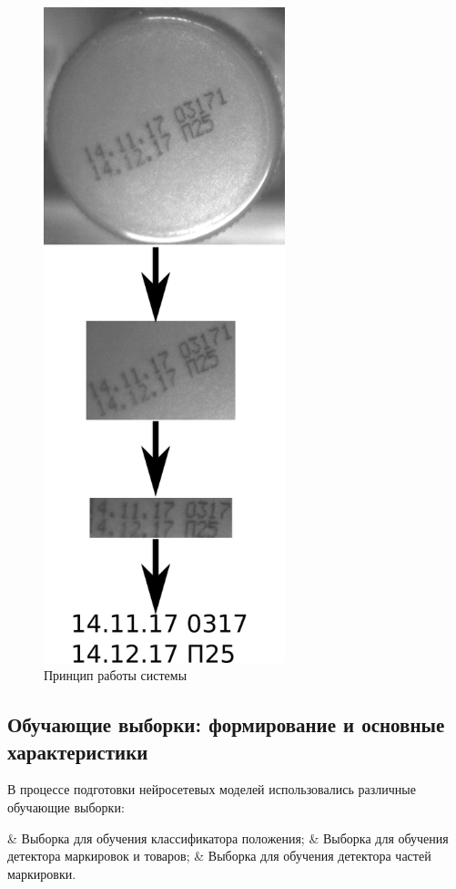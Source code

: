 \begin{figure}[!ht]
	\centering
	\includegraphics[width=7cm]{man-source/images/ch4/pic4-5.png}
	\caption{Принцип работы системы}
	\label{fig:system_work}
\end{figure}

\subsection{Обучающие выборки: формирование и основные характеристики}

В процессе подготовки нейросетевых моделей использовались различные обучающие выборки:

\begin{easylist}
	& Выборка для обучения классификатора положения;
	& Выборка для обучения детектора маркировок и товаров;
	& Выборка для обучения детектора частей маркировки.
\end{easylist} 

